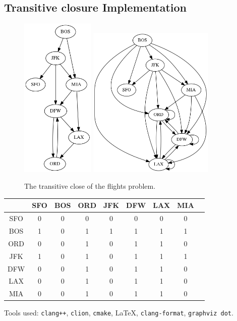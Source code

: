 \documentclass[a4paper,12pt]{article}
\begin{document}
\subsection*{Transitive closure Implementation}


\begin{figure} 
	\centering
  \includegraphics[width=3.5cm]{code/gflight.png}	
	\includegraphics[width=6cm]{code/gflight-trans.png} 
	\caption{The transitive close of the flights problem.}	 
\end{figure}
 
\begin{center}
 \begin{tabular}{||c | c c c c c c c c||} 
 \hline
	&SFO	&BOS	&ORD	&JFK	&DFW	&LAX	&MIA	&\\
\hline\hline
SFO	&0		&0		&0		&0		&0		&0		&0		&\\
BOS	&1		&0		&1		&1		&1		&1		&1		&\\
ORD	&0		&0		&1		&0		&1		&1		&0		&\\
JFK	&1		&0		&1		&0		&1		&1		&1		&\\
DFW	&0		&0		&1		&0		&1		&1		&0		&\\
LAX	&0		&0		&1		&0		&1		&1		&0		&\\
MIA	&0		&0		&1		&0		&1		&1		&0		&\\
\hline
\end{tabular}
\end{center}

\vfill
\noindent Tools used: \texttt{clang++}, \texttt{clion},  \texttt{cmake}, \LaTeX{}, \texttt{clang-format}, \texttt{graphviz dot}.
\end{document}

